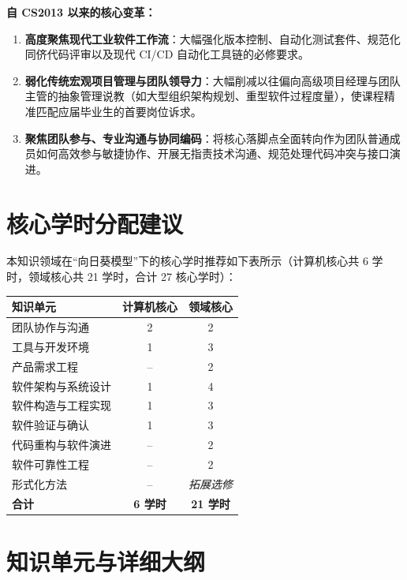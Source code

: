 \begin{preamblebox}[知识领域概述与时代演进]
\textbf{自 CS2013 以来的核心变革：}
\begin{enumerate}
    \item \textbf{高度聚焦现代工业软件工作流}：大幅强化版本控制、自动化测试套件、规范化同侪代码评审以及现代 CI/CD 自动化工具链的必修要求。
    \item \textbf{弱化传统宏观项目管理与团队领导力}：大幅削减以往偏向高级项目经理与团队主管的抽象管理说教（如大型组织架构规划、重型软件过程度量），使课程精准匹配应届毕业生的首要岗位诉求。
    \item \textbf{聚焦团队参与、专业沟通与协同编码}：将核心落脚点全面转向作为团队普通成员如何高效参与敏捷协作、开展无指责技术沟通、规范处理代码冲突与接口演进。
\end{enumerate}
\end{preamblebox}

\section{核心学时分配建议}

本知识领域在“向日葵模型”下的核心学时推荐如下表所示（计算机核心共 6 学时，领域核心共 21 学时，合计 27 核心学时）：

\begin{table}[H]
\centering
\setlength{\tabcolsep}{3.5pt}\fontsize{8pt}{9.6pt}\selectfont\begin{tabularx}{\columnwidth}{Y c c}
\toprule
\textbf{知识单元} & \textbf{计算机核心} & \textbf{领域核心} \\
\midrule
团队协作与沟通 & 2 & 2 \\
工具与开发环境 & 1 & 3 \\
产品需求工程 & -- & 2 \\
软件架构与系统设计 & 1 & 4 \\
软件构造与工程实现 & 1 & 3 \\
软件验证与确认 & 1 & 3 \\
代码重构与软件演进 & -- & 2 \\
软件可靠性工程 & -- & 2 \\
形式化方法 & -- & \emph{拓展选修} \\
\midrule
\textbf{合计} & \textbf{6 学时} & \textbf{21 学时} \\
\bottomrule
\end{tabularx}
\end{table}

\section{知识单元与详细大纲}

